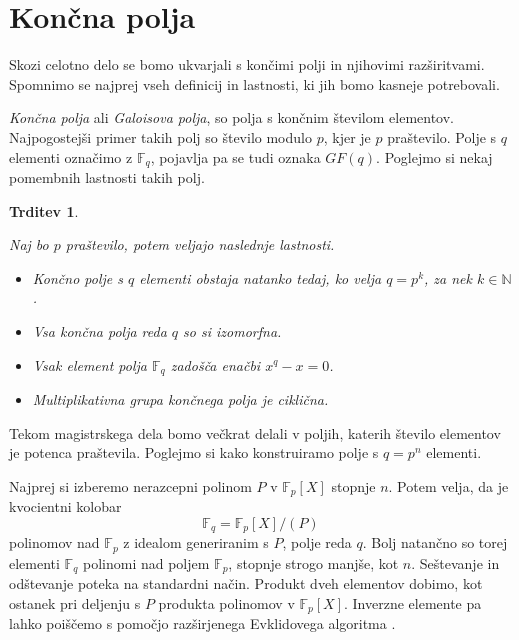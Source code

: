 \documentclass[12pt,a4paper,twoside]{article}
\theoremstyle{definition} %
\theoremstyle{plain} %
\newtheorem{trditev}[definicija]{Trditev}
\numberwithin{equation}{section}  %
\newcommand{\N}{\mathbb N}
\newcommand{\F}{\mathbb F}
\begin{document}
\newpage



\section{Končna polja}

Skozi celotno delo se bomo ukvarjali s končimi polji in njihovimi razširitvami. Spomnimo se najprej vseh definicij in lastnosti, ki jih bomo kasneje potrebovali.

\emph{Končna polja} ali \emph{Galoisova polja}, so polja s končnim številom elementov. Najpogostejši primer takih polj so število modulo $p$, kjer je $p$ praštevilo. Polje s $q$ elementi označimo z $\F_q$, pojavlja pa se tudi oznaka $GF(q)$. Poglejmo si nekaj pomembnih lastnosti takih polj.
\begin{trditev}~

Naj bo $p$ praštevilo, potem veljajo naslednje lastnosti.
\begin{itemize}
\item Končno polje s $q$ elementi obstaja natanko tedaj, ko velja $q=p^k$, za nek $k \in \N$.
\item Vsa končna polja reda $q$ so si izomorfna.
\item Vsak element polja $\F_q$ zadošča enačbi $x^{q} -x = 0$.
\item Multiplikativna grupa končnega polja je ciklična.

\end{itemize}
\end{trditev}

Tekom magistrskega dela bomo večkrat delali v poljih, katerih število elementov je potenca praštevila. Poglejmo si kako konstruiramo polje s $q = p^n$ elementi.

Najprej si izberemo nerazcepni polinom $P$ v $\F_p[X]$ stopnje $n$. Potem velja, da je kvocientni kolobar
$$\F_q = \F_p[X]/(P)$$
polinomov nad $\F_p$ z idealom generiranim s $P$, polje reda $q$.
Bolj natančno so torej elementi $\F_q$ polinomi nad poljem $\F_p$, stopnje strogo manjše, kot $n$. Seštevanje in odštevanje  poteka na standardni način. Produkt dveh elementov dobimo, kot ostanek pri deljenju s $P$ produkta polinomov v $\F_p[X]$. Inverzne elemente pa lahko poiščemo s pomočjo razširjenega Evklidovega algoritma \cite{Extended2020}.
\end{document}
